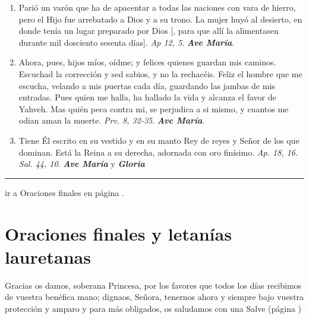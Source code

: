 \documentclass[11pt,a4paper]{book}
\begin{document}
\begin{enumerate}
        \item Parió un varón que ha de apacentar a todas las naciones con vara de hierro, pero el Hijo fue arrebatado a Dios y a su trono. La mujer huyó
            al desierto, en donde tenía un lugar preparado por Dios [, para que allí la alimentasen durante mil dosciento sesenta días]. \emph{Ap 12, 5}. \textbf{\emph{Ave María}}.

        \item Ahora, pues, hijos míos, oídme; y felices quienes guardan mis caminos. Escuchad la corrección y sed sabios, y no la rechacéis.  
            Feliz el hombre que me escucha, velando a mis puertas cada día, guardando las jambas de mis entradas. Pues quien me halla, ha hallado la vida y alcanza el favor 
            de Yahveh. Mas quién peca contra mi, se perjudica a si mismo, y cuantos me odian aman la muerte. \emph{Prv. 8, 32-35}. \textbf{\emph{Ave María}}.

        \item Tiene Él escrito en su vestido y en su manto Rey de reyes y Señor de los que dominan. Está la Reina a su derecha, adornada con oro finísimo. 
            \emph{Ap. 18, 16. Sal. 44, 10}. \textbf{\emph{Ave María}} y \textbf{\emph{Gloria}}

    \end{enumerate}    

    \rule{\textwidth}{0.5pt}
    

    ir a Oraciones finales en página \pageref{sec:final-prayer}.

    \section*{Oraciones finales y letanías lauretanas} 
    \label{sec:final-prayer}

    Gracias os damos, soberana Princesa, por los favores que todos los días recibimos de vuestra benéfica mano; dignaos, Señora, tenernos ahora 
    y siempre bajo vuestra protección y amparo y para más obligados, os saludamos con una Salve (página \pageref{sec:salve})
\end{document}
